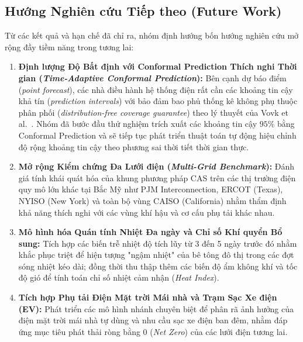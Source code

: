 \subsection{Hướng Nghiên cứu Tiếp theo (Future Work)}
Từ các kết quả và hạn chế đã chỉ ra, nhóm định hướng bốn hướng nghiên cứu mở rộng đầy tiềm năng trong tương lai:
\begin{enumerate}
    \item \textbf{Định lượng Độ Bất định với Conformal Prediction Thích nghi Thời gian (\textit{Time-Adaptive Conformal Prediction}):}
    Bên cạnh dự báo điểm (\textit{point forecast}), các nhà điều hành hệ thống điện rất cần các khoảng tin cậy khả tín (\textit{prediction intervals}) với bảo đảm bao phủ thống kê không phụ thuộc phân phối (\textit{distribution-free coverage guarantee}) theo lý thuyết của Vovk et al.~\cite{vovk2005algorithmic}. Nhóm đã bước đầu thử nghiệm trích xuất các khoảng tin cậy $95\%$ bằng Conformal Prediction và sẽ tiếp tục phát triển thuật toán tự động hiệu chỉnh độ rộng khoảng tin cậy theo phương sai thời tiết thời gian thực.
    \item \textbf{Mở rộng Kiểm chứng Đa Lưới điện (\textit{Multi-Grid Benchmark}):}
    Đánh giá tính khái quát hóa của khung phương pháp CAS trên các thị trường điện quy mô lớn khác tại Bắc Mỹ như PJM Interconnection, ERCOT (Texas), NYISO (New York) và toàn bộ vùng CAISO (California) nhằm thẩm định khả năng thích nghi với các vùng khí hậu và cơ cấu phụ tải khác nhau.
    \item \textbf{Mô hình hóa Quán tính Nhiệt Đa ngày và Chỉ số Khí quyển Bổ sung:}
    Tích hợp các biến trễ nhiệt độ tích lũy từ 3 đến 5 ngày trước đó nhằm khắc phục triệt để hiện tượng "ngậm nhiệt" của bê tông đô thị trong các đợt sóng nhiệt kéo dài; đồng thời thu thập thêm các biến độ ẩm không khí và tốc độ gió để tính toán chỉ số nhiệt cảm nhận (\textit{Heat Index}).
    \item \textbf{Tích hợp Phụ tải Điện Mặt trời Mái nhà và Trạm Sạc Xe điện (EV):}
    Phát triển các mô hình nhánh chuyên biệt để phân rã ảnh hưởng của điện mặt trời mái nhà tự dùng và nhu cầu sạc xe điện ban đêm, nhằm đáp ứng mục tiêu phát thải ròng bằng 0 (\textit{Net Zero}) của các lưới điện tương lai.
\end{enumerate}
